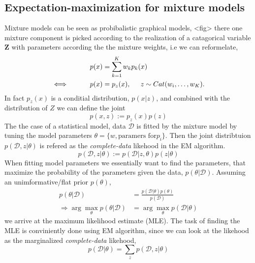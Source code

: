 \subsection{Expectation-maximization for mixture models}
Mixture models can be seen as probibalistic graphical models, <fig> there one mixture component is
picked according to the realization of a catagorical variable $\textbf{Z}$ with parameters according
the the mixture weights, i.e we can reformelate, 
\begin{align}\label{mixture_pdf}
    p(x) &= \sum_{k=1}^K w_k p_k(x)\\
   \iff \hspace*{1cm} p(x) &= p_z(x), \hspace*{0.5cm} z \sim Cat(w_i, \dots, w_K).
\end{align}
In fact $p_z(x)$ is a conditial distribution, $p(x|z)$, and combined with the distribution
of $Z$ we can define the joint 
$$p(x,z):=p_z(x)p(z)$$
The the case of a statistical model, data $\mathcal{D}$ is fitted by the mixture model 
by tuning the model parameters $\theta = \{w, \text{paramers for} p_i\}$. Then the joint
distribtuion $p(\mathcal{D},z| \theta)$ is refered as the \textit{complete-data} likehood in the EM algorithm. 
$$p(\mathcal{D},z|\theta):=p(\mathcal{D}|z,\theta)p(z|\theta)$$ 
When fitting model parameters we essentially want to find the parameters, that maximize the probability of
the parameters given the data, $p(\theta|\mathcal{D})$. Assuming an
unimformative/flat prior $p(\theta)$, 
\begin{align*}
p(\theta|\mathcal{D})&= \frac{p(\mathcal{D}|\theta)p(\theta)}{p(\mathcal{D})}\\
\Rightarrow  \arg\max_{\theta} p(\theta|\mathcal{D}) &= \arg\max_{\theta} p(\mathcal{D}|\theta)
\end{align*}
we arrive at the maximum likelihood estimate (MLE). The task of finding the MLE is conviniently
done using EM algorithm, since we can look at the likehood as the marginalized
\textit{complete-data} likehood, 
$$p(\mathcal{D}|\theta) = \sum_z p(\mathcal{D}, z|\theta)$$


